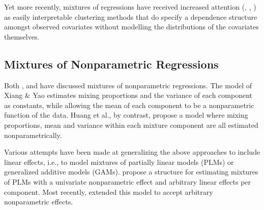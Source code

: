 \documentclass[10pt]{olplainarticle}\usepackage[]{graphicx}\usepackage[]{color}
\begin{document}
Yet more recently, mixtures of regressions have received increased attention (\cite{mixglm}, \cite{viele}, \cite{hurn}) as easily interpretable clustering methods that do specify a dependence structure amongst observed covariates without modelling the distributions of the covariates themselves. 







\subsection{Mixtures of Nonparametric Regressions}

Both \cite{xiang}, and \cite{huang} have discussed mixtures of nonparametric regressions. The model of Xiang \& Yao estimates mixing proportions and the variance of each component as constants, while allowing the mean of each component to be a nonparametric function of the data. Huang et al., by contrast, propose a model where mixing proportions, mean and variance within each mixture component are all estimated nonparametrically.

Various attempts have been made at generalizing the above approaches to include linear effects, i.e., to model mixtures of partially linear models (PLMs) or generalized additive models (GAMs). \cite{wu} propose a structure for estimating mixtures of PLMs with a univariate nonparametric effect and arbitrary linear effects per component. Most recently, \cite{zhangpan} extended this model to accept arbitrary nonparametric effects.



\end{document}
